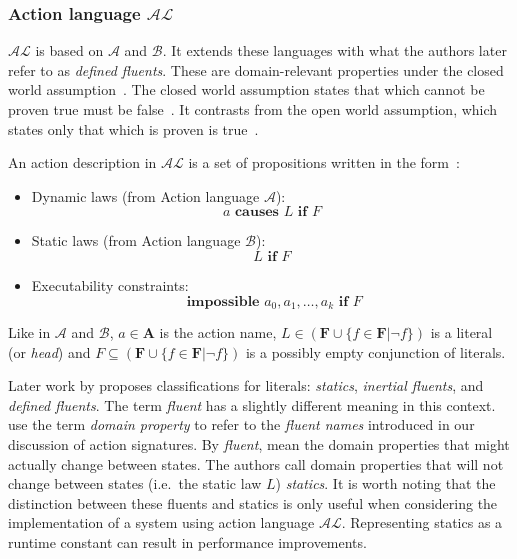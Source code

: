 \subsubsection{Action language $ \mathcal{AL} $}
\label{subsubsec:action_language_al}

$ \mathcal{AL} $ is based on $ \mathcal{A} $ and $ \mathcal{B} $.
It extends these languages with what the authors later refer to as \textit{defined fluents}.
These are domain-relevant properties under the closed world assumption~\citep{blount_architecture_2013}.
The closed world assumption states that which cannot be proven true must be false~\citep{reiter_closed_1981}.
It contrasts from the open world assumption, which states only that which is proven is true~\citep{reiter_closed_1981}.

An action description in $ \mathcal{AL} $ is a set of propositions written in the form~\citep{baral_reasoning_2000, blount_architecture_2013}:

\begin{itemize}
    \item Dynamic laws (from Action language $ \mathcal{A} $):
        \[
        a \textbf{ causes } L \textbf{ if } F
        \]

    \item Static laws (from Action language $ \mathcal{B} $):
        \[
        L \textbf{ if } F
        \]

    \item Executability constraints:
        \[
        \textbf{ impossible } a_0, a_1, \dots, a_k \textbf{ if } F
        \]
\end{itemize}

Like in $\mathcal{A}$ and $\mathcal{B}$, $a \in \boldsymbol{A}$ is the action name, $L \in(\boldsymbol{F} \cup\{f \in \boldsymbol{F}| \neg f\}) $ is a literal (or \textit{head}) and $F \subseteq(\boldsymbol{F} \cup\{f \in \boldsymbol{F}| \neg f\})$ is a possibly empty conjunction of literals.

Later work by \citet{gelfond_knowledge_2014} proposes classifications for literals: \textit{statics}, \textit{inertial fluents}, and \textit{defined fluents}.
The term \textit{fluent} has a slightly different meaning in this context.
\citet{gelfond_knowledge_2014} use the term \textit{domain property} to refer to the \textit{fluent names} introduced in our discussion of action signatures.
By \textit{fluent}, \citet{gelfond_knowledge_2014} mean the domain properties that might actually change between states.
The authors call domain properties that will not change between states (i.e.~the static law $L$) \textit{statics}.
It is worth noting that the distinction between these fluents and statics is only useful when considering the implementation of a system using action language $\mathcal{AL}$.
Representing statics as a runtime constant can result in performance improvements.


